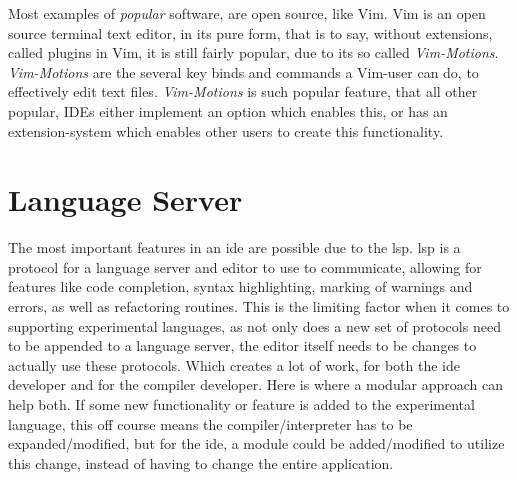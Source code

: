 
Most examples of \textit{popular} software, are open source, like Vim. Vim is an
open source terminal text editor, in its pure form, that is to say, without
extensions, called plugins in Vim, it is still fairly popular, due to its so
called \textit{Vim-Motions}. \textit{Vim-Motions} are the several key binds and
commands a Vim-user can do, to effectively edit text files. \textit{Vim-Motions}
is such popular feature, that all other popular, IDEs either implement an option
which enables this, or has an extension-system which enables other users to
create this functionality.

\section{Language Server}


The most important features in an \gls{ide} are possible due to the \gls{lsp}.
\gls{lsp} is a protocol for a language server and editor to use to communicate,
allowing for features like code completion, syntax highlighting, marking of
warnings and errors, as well as refactoring routines. This is the limiting
factor when it comes to supporting experimental languages, as not only does a
new set of protocols need to be appended to a language server, the editor itself
needs to be changes to actually use these protocols. Which creates a lot of
work, for both the \gls{ide} developer and for the compiler developer. Here is
where a modular approach can help both. If some new functionality or feature is
added to the experimental language, this off course means the
compiler/interpreter has to be expanded/modified, but for the \gls{ide}, a
module could be added/modified to utilize this change, instead of having to
change the entire application.
